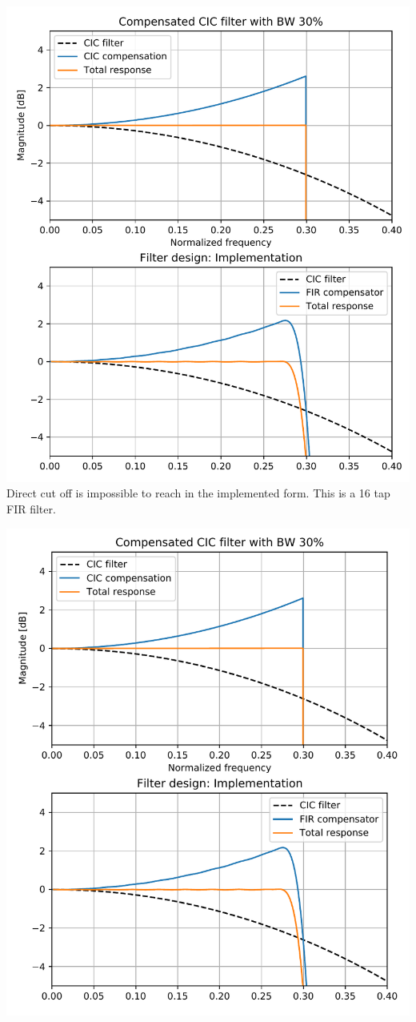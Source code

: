 \documentclass{article}
\begin{document}
\begin{center}
	\begin{minipage}{0.40\linewidth}
		\includegraphics[width=0.99\linewidth]{fir-des-3.pdf}
		Direct cut off is impossible to reach in the implemented
		form. This is a 16 tap FIR filter.
	\end{minipage}
	\begin{minipage}{0.40\linewidth}
		\includegraphics[width=0.99\linewidth]{fir-des-4.pdf}

\end{minipage}
\end{center}
\end{document}

